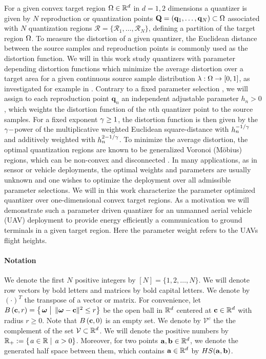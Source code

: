 \documentclass[smallabstract,smallcaptions]{dccpaper}
\newcounter{example}[section]
\renewcommand{\vp}{\mathbf q}
\renewcommand{\vP}{\mathbf Q}
\newcommand{\Ball}{\ensuremath{B}}          %
\newcommand{\Vor}{\ensuremath{\mathcal{V}}}         %
\newcommand{\Rset}{\ensuremath{\mathcal R}}
\newcommand{\philippstart}{\color{black}}
\newcommand{\philippend}{\color{black}}
\begin{document}
%
For a given convex target region $\Omega\in{\ensuremath{\mathbb R}}^d$ in $d=1,2$ dimensions a quantizer is given by $N$ reproduction or
quantization points $\vP=(\vp_1,\dots,\vp_N)\subset \Ome$ associated with $N$ quantization regions
$\Rset=\{\Rset_1,\dots,\Rset_N\}$, defining a partition of the target region $\Omega$.
%
%
To measure the distortion of a given quantizer, the Euclidean distance between the source samples and reproduction
points is commonly used as the distortion function. We will in this work study  quantizers with parameter depending
distortion functions which minimize the average distortion over a target area for a given continuous source sample
distribution $\lambda:\Omega\to [0,1]$, as investigated for example in \cite{Erdem16,KJ17}.
%
Contrary to a fixed parameter selection \cite{KSS18}, we will assign to each reproduction point $\vp_n$ an independent
adjustable parameter $h_n>0$, which weights the distortion function of the $n$th quantizer point to the source samples.
For a fixed exponent $\gamma\geq1$, the distortion function is then given by the $\gamma-$power of the  multiplicative
weighted Euclidean square-distance with $h_n^{-1/\gamma}$ and additively weighted with $h_n^{2-1/\gamma}$. To minimize the
average distortion, the optimal quantization regions are known to be generalized Voronoi (Möbius) regions, which can be
non-convex and disconnected \cite{BWY07}. In many applications, as in sensor or vehicle deployments, the optimal weights
and parameters are usually unknown and one wishes to optimize the deployment over all admissible parameter selections.
%
We will in this work characterize the parameter optimized quantizer  over one-dimensional convex target
regions. As a motivation we will demonstrate such a parameter driven quantizer for an unmanned aerial vehicle (UAV) deployment
to provide energy efficiently a communication to ground terminals in a given target region. 
Here the parameter weight refers to  the UAVs flight heights.  

\philippstart \paragraph{Notation} We denote the first
$N$ positive integers by $[N]=\{1,2,\dots,N\}$. We will denote row vectors by bold letters and
matrices by bold capital letters. We denote by $(\cdot)^T$ the transpose of a vector or matrix.
For convenience, let $\Ball\left(\vc,r\right)=\set{\vome}{\|\vome-\vc\|^2\le r}$ be the open ball in ${\mathbb R}^d$ centered at
${\mathbf c}\in{\ensuremath{\mathbb R}}^d$ with radius $r\geq 0$. Note that $\Ball\left(\vc,0\right)$ is an empty set. We denote by $\Vor^c$ the
the complement of the set $\Vor\subset\R^d$. We will denote the positive numbers by $\R_+:=\set{a\in\R}{a>0}$.
Moreover, for two points ${\mathbf a},{\mathbf b}\in{\ensuremath{\mathbb R}}^d$, we denote the generated half space between them, which contains ${\mathbf a}\in{\ensuremath{\mathbb R}}^d$
by $HS({\mathbf a}, {\mathbf b})$.  \philippend
\end{document}

